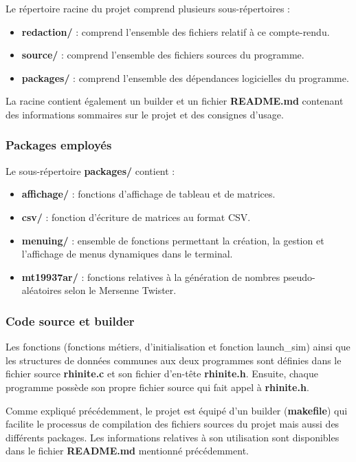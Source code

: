 \documentclass[12pt,french,titlepage]{article}
\begin{document}
Le répertoire racine du projet comprend plusieurs sous-répertoires :
\begin{itemize}
\item \textbf{redaction/} : comprend l'ensemble des fichiers relatif à ce compte-rendu.
\item \textbf{source/} : comprend l'ensemble des fichiers sources du programme.
\item \textbf{packages/} : comprend l'ensemble des dépendances logicielles du programme.
\end{itemize}

La racine contient également un builder et un fichier \textbf{README.md} contenant des informations sommaires sur le projet et des consignes d'usage.

\newpage
 
\subsubsection{Packages employés}
Le sous-répertoire \textbf{packages/} contient :
\begin{itemize}
\item \textbf{affichage/} : fonctions d'affichage de tableau et de matrices.
\item \textbf{csv/} : fonction d'écriture de matrices au format CSV.
\item \textbf{menuing/} : ensemble de fonctions permettant la création, la gestion et l'affichage de menus dynamiques dans le terminal.
\item \textbf{mt19937ar/} : fonctions relatives à la génération de nombres pseudo-aléatoires selon le Mersenne Twister. 
\end{itemize}

\subsubsection{Code source et builder}
Les fonctions (fonctions métiers, d'initialisation et fonction launch\_sim) ainsi que les structures de données communes aux deux programmes sont définies dans le fichier source \textbf{rhinite.c} et son fichier d'en-tête \textbf{rhinite.h}. Ensuite, chaque programme possède son propre fichier source qui fait appel à \textbf{rhinite.h}.

Comme expliqué précédemment, le projet est équipé d'un builder (\textbf{makefile}) qui facilite le processus de compilation des fichiers sources du projet mais aussi des différents packages. Les informations relatives à son utilisation sont disponibles dans le fichier \textbf{README.md} mentionné précédemment.
\end{document}
